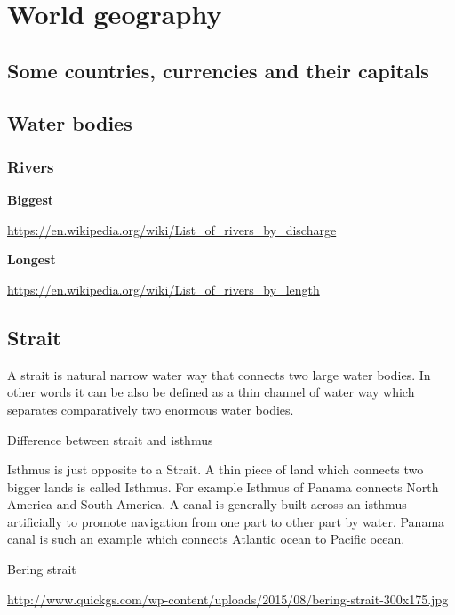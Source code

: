 \documentclass[
  openany]{book}
\begin{document}
\hypertarget{world-geography}{%
\chapter{World geography}\label{world-geography}}

\hypertarget{some-countries-currencies-and-their-capitals}{%
\section{Some countries, currencies and their capitals}\label{some-countries-currencies-and-their-capitals}}

\hypertarget{water-bodies}{%
\section{Water bodies}\label{water-bodies}}

\hypertarget{rivers}{%
\subsection{Rivers}\label{rivers}}

\textbf{Biggest}

\url{https://en.wikipedia.org/wiki/List_of_rivers_by_discharge}

\textbf{Longest}

\url{https://en.wikipedia.org/wiki/List_of_rivers_by_length}

\hypertarget{strait}{%
\section{Strait}\label{strait}}

A strait is natural narrow water way that connects two large water bodies. In other words it can be also be defined as a thin channel of water way which separates comparatively two enormous water bodies.

Difference between strait and isthmus

Isthmus is just opposite to a Strait. A thin piece of land which connects two bigger lands is called Isthmus. For example Isthmus of Panama connects North America and South America. A canal is generally built across an isthmus artificially to promote navigation from one part to other part by water. Panama canal is such an example which connects Atlantic ocean to Pacific ocean.

Bering strait

\url{http://www.quickgs.com/wp-content/uploads/2015/08/bering-strait-300x175.jpg}
\end{document}

